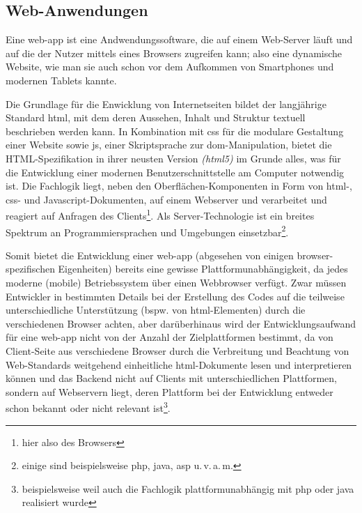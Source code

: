 \subsection{Web-Anwendungen}

Eine \gls{web-app} ist eine Andwendungssoftware, die auf einem Web-Server läuft und auf die der Nutzer mittels eines Browsers zugreifen kann; also eine dynamische Website, wie man sie auch schon vor dem Aufkommen von Smartphones und modernen Tablets kannte. 

Die Grundlage für die Enwicklung von Internetseiten bildet der langjährige Standard \gls{html}, mit dem deren Aussehen, Inhalt und Struktur textuell beschrieben werden kann. 
In Kombination mit \gls{css} für die modulare Gestaltung einer Website sowie \gls{js}, einer Skriptsprache zur \gls{dom}-Manipulation, bietet die HTML-Spezifikation in ihrer neusten Version \textit{(\gls{html5})} im Grunde alles, was für die Entwicklung einer modernen Benutzerschnittstelle am Computer notwendig ist. 
Die Fachlogik liegt, neben den Oberflächen-Komponenten in Form von \mbox{\gls{html}-,} \gls{css}- und Javascript-Dokumenten, auf einem Webserver und verarbeitet und reagiert auf Anfragen des Clients\footnote{hier also des Browsers}.
Als Server-Technologie ist ein breites Spektrum an Programmiersprachen und Umgebungen einsetzbar\footnote{einige sind beispielsweise \gls*{php}, \gls*{java}, \gls*{asp} u.\,v.\,a.\,m.}.

Somit bietet die Entwicklung einer \gls{web-app} (abgesehen von einigen browser-spezifischen Eigenheiten) bereits eine gewisse Plattformunabhängigkeit, da jedes moderne (mobile) Betriebssystem über einen Webbrowser verfügt. 
Zwar müssen Entwickler in bestimmten Details bei der Erstellung des Codes auf die teilweise unterschiedliche Unterstützung (bspw. von \gls{html}-Elementen)  durch die verschiedenen Browser achten, aber darüberhinaus wird der Entwicklungsaufwand für eine \gls{web-app} nicht von der Anzahl der Zielplattformen bestimmt, da von Client-Seite aus verschiedene Browser durch die Verbreitung und Beachtung von Web-Standards weitgehend einheitliche \gls{html}-Dokumente lesen und interpretieren können und das Backend nicht auf Clients mit unterschiedlichen Plattformen, sondern auf Webservern liegt, deren Plattform bei der Entwicklung entweder schon bekannt oder nicht relevant ist\footnote{beispielsweise weil auch die Fachlogik plattformunabhängig mit \gls*{php} oder \gls*{java} realisiert wurde}.

